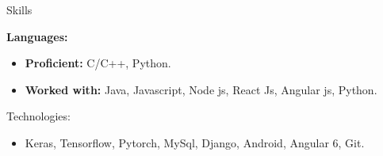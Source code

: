 \documentclass[]{mcdowellcv}
\def\first{8pt}
\begin{document}
		\begin{cvsection}{Skills}
	 
		\begin{cvsubsection}{}{}{}
		    \begin{description}
		     \vspace*{\first}
		     \hspace*{-8pt}\textbf{Languages:}
		    \end{description}
			\begin{itemize}
				\item \textbf{Proficient:} C/C++, Python.
				\item \textbf{Worked with:}  Java, Javascript, Node js, React Js, Angular js, Python.
			\end{itemize}
		\end{cvsubsection}
		\begin{cvsubsection}{\hspace*{\first}Technologies:}{}{}
			\begin{itemize}
			  \item Keras, Tensorflow,  Pytorch, MySql, Django, Android, Angular 6, Git. 
			\end{itemize}
		\end{cvsubsection}
	\end{cvsection}
\end{document}
